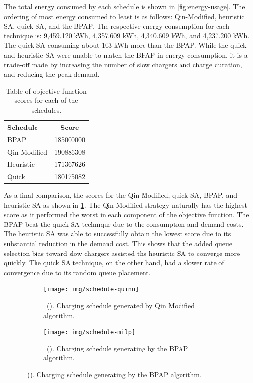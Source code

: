 \documentclass[energies,article,submit,moreauthors]{Definitions/mdpi}
\newcommand\mysubcaption[1]{\phantomcaption%
\caption*{\figurename~\thefigure(\thesubfigure). #1}}
\begin{document}
The total energy consumed by each schedule is shown in \ref{fig:energy-usage}. The ordering of most energy consumed to
least is as follows: Qin-Modified, heuristic SA, quick SA, and the BPAP. The respective energy consumption for each
technique is: 9,459.120 kWh, 4,357.609 kWh, 4,340.609 kWh, and 4,237.200 kWh. The quick SA consuming about 103 kWh more
than the BPAP. While the quick and heuristic SA were unable to match the BPAP in energy consumption, it is a trade-off
made by increasing the number of slow chargers and charge duration, and reducing the peak demand.

\begin{table}[htbp]
\caption{\label{tab:scores}Table of objective function scores for each of the schedules.}
\centering
\begin{tabular}{l|c}
\hline
Schedule & Score\\[0pt]
\hline
BPAP & \num{185000000}\\[0pt]
Qin-Modified & \num{190886308}\\[0pt]
Heuristic & \num{171367626}\\[0pt]
Quick & \num{180175082}\\[0pt]
\hline
\end{tabular}
\end{table}

As a final comparison, the scores for the Qin-Modified, quick SA, BPAP, and heuristic SA as shown in \ref{tab:scores}. The
Qin-Modified strategy naturally has the highest score as it performed the worst in each component of the objective
function. The BPAP beat the quick SA technique due to the consumption and demand costs. The heuristic SA was able to
successfully obtain the lowest score due to its substantial reduction in the demand cost. This shows that the added
queue selection bias toward slow chargers assisted the heuristic SA to converge more quickly. The quick SA technique, on
the other hand, had a slower rate of convergence due to its random queue placement.

\begin{figure}
  \centering
  \begin{subfigure}[t]{\textwidth}
    \centering
    \texttt{[image: img/schedule-quinn]}
    \mysubcaption{Charging schedule generated by Qin Modified algorithm.}
    \label{subfig:schedule-qin}
  \end{subfigure}

  \hfill

  \begin{subfigure}[t]{\textwidth}
    \centering
    \texttt{[image: img/schedule-milp]}
    \mysubcaption{Charging schedule generating by the BPAP algorithm.}
    \label{subfig:schedule-milp}
  \end{subfigure}
\end{figure}
\end{document}
